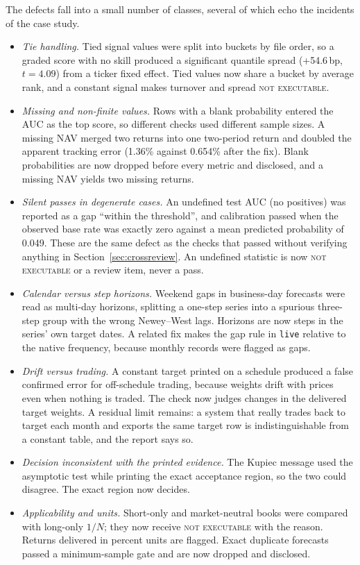 \documentclass[11pt]{article}
\begin{document}
The defects fall into a small number of classes, several of which echo the incidents of the case study.
\begin{itemize}[leftmargin=*,itemsep=2pt]
\item \emph{Tie handling.} Tied signal values were split into buckets by file order, so a graded score with no skill produced a significant quantile spread (+54.6\,bp, $t=4.09$) from a ticker fixed effect. Tied values now share a bucket by average rank, and a constant signal makes turnover and spread \textsc{not executable}.
\item \emph{Missing and non-finite values.} Rows with a blank probability entered the AUC as the top score, so different checks used different sample sizes. A missing NAV merged two returns into one two-period return and doubled the apparent tracking error (1.36\% against 0.654\% after the fix). Blank probabilities are now dropped before every metric and disclosed, and a missing NAV yields two missing returns.
\item \emph{Silent passes in degenerate cases.} An undefined test AUC (no positives) was reported as a gap ``within the threshold'', and calibration passed when the observed base rate was exactly zero against a mean predicted probability of 0.049. These are the same defect as the checks that passed without verifying anything in Section~\ref{sec:crossreview}. An undefined statistic is now \textsc{not executable} or a review item, never a pass.
\item \emph{Calendar versus step horizons.} Weekend gaps in business-day forecasts were read as multi-day horizons, splitting a one-step series into a spurious three-step group with the wrong Newey--West lags. Horizons are now steps in the series' own target dates. A related fix makes the gap rule in \texttt{live} relative to the native frequency, because monthly records were flagged as gaps.
\item \emph{Drift versus trading.} A constant target printed on a schedule produced a false confirmed error for off-schedule trading, because weights drift with prices even when nothing is traded. The check now judges changes in the delivered target weights. A residual limit remains: a system that really trades back to target each month and exports the same target row is indistinguishable from a constant table, and the report says so.
\item \emph{Decision inconsistent with the printed evidence.} The Kupiec message used the asymptotic test while printing the exact acceptance region, so the two could disagree. The exact region now decides.
\item \emph{Applicability and units.} Short-only and market-neutral books were compared with long-only $1/N$; they now receive \textsc{not executable} with the reason. Returns delivered in percent units are flagged. Exact duplicate forecasts passed a minimum-sample gate and are now dropped and disclosed.
\end{itemize}
\end{document}

